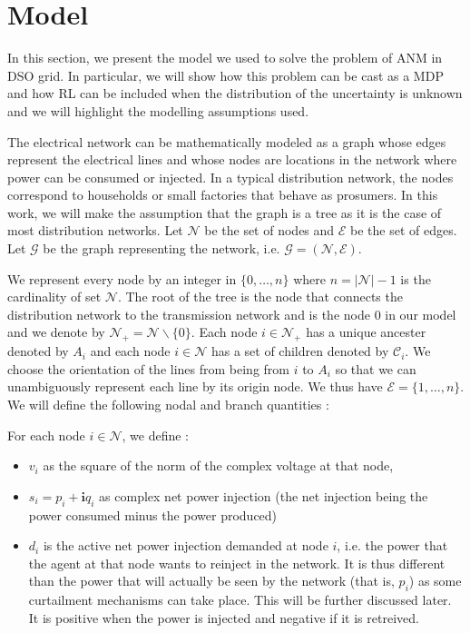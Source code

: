 \section{Model}
\label{sec:model}

In this section, we present the model we used to solve the problem of ANM in DSO grid.
In particular, we will show how this problem can be cast as a MDP and how RL can be included when the distribution of the uncertainty is unknown and we will highlight the modelling assumptions used.

The electrical network can be mathematically modeled as a graph whose edges represent the electrical lines and whose nodes are locations in the network where power can be consumed or injected.
In a typical distribution network, the nodes correspond to households or small factories that behave as prosumers.
In this work, we will make the assumption that the graph is a tree as it is the case of most distribution networks.
Let $\mathcal{N}$ be the set of nodes and $\mathcal{E}$ be the set of edges.
Let $\mathcal{G}$ be the graph representing the network, i.e. $\mathcal{G} = (\mathcal{N}, \mathcal{E})$.

We represent every node by an integer in $\{0, \dots, n\}$ where $n = |\mathcal{N}|-1$ is the cardinality of set $\mathcal{N}$.
The root of the tree is the node that connects the distribution network to the transmission network and is the node $0$ in our model and we denote by $\mathcal{N}_+ = \mathcal{N} \backslash \{0\}$.
Each node $i \in \mathcal{N}_+$ has a unique ancester denoted by $A_i$ and each node $i \in \mathcal{N}$ has a set of children denoted by $\mathcal{C}_i$.
We choose the orientation of the lines from being from $i$ to $A_i$ so that we can unambiguously represent each line by its origin node.
We thus have $\mathcal{E} = \{1, \dots, n\}$.
We will define the following nodal and branch quantities :

For each node $i \in \mathcal{N}$, we define :
\begin{itemize}
  \item $v_i$ as the square of the norm of the complex voltage at that node,
  \item $s_i = p_i + \mathbf{i} q_i$ as complex net power injection (the net injection being the power consumed minus the power produced)
  \item $d_i$ is the active net power injection demanded at node $i$, i.e. the power that the agent at that node wants to reinject in the network.
  It is thus different than the power that will actually be seen by the network (that is, $p_{i}$) as some curtailment mechanisms can take place.
  This will be further discussed later.
  It is positive when the power is injected and negative if it is retreived.
\end{itemize}

